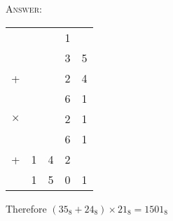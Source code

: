 \textsc{Answer:}\vspace{-2mm}
\begin{answerlong}
\begin{longtable}{ccccc}
            &   &   & 1 &   \\
            &   &   & 3 & 5 \\
+           &   &   & 2 & 4 \\ \hline
            &   &   & 6 & 1 \\
$\times$    &   &   & 2 & 1 \\ \hline
            &   &   & 6 & 1 \\
+           & 1 & 4 & 2 &   \\ \hline
            & 1 & 5 & 0 & 1 \\ \hline
\end{longtable}
Therefore $(35_{8} + 24_{8}) \times 21_{8} = 1501_{8}$
\end{answerlong}
